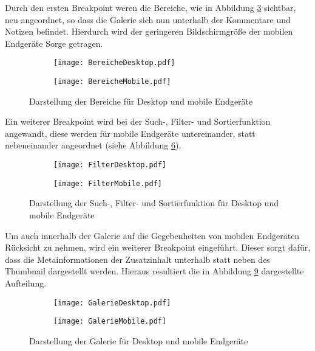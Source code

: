 Durch den ersten Breakpoint weren die Bereiche, wie in Abbildung \ref{fig:BereicheDesktopMobile} sichtbar, neu angeordnet, so dass die Galerie sich nun unterhalb der Kommentare und Notizen befindet. Hierdurch wird der geringeren Bildschirmgröße der mobilen Endgeräte Sorge getragen.

\begin{figure}[h!]
\begin{subfigure}[c]{0.5\textwidth}
\texttt{[image: BereicheDesktop.pdf]}
\label{fig:BereicheDesktop}
\end{subfigure}%
\begin{subfigure}[c]{0.5\textwidth}
\texttt{[image: BereicheMobile.pdf]}
\label{fig:BereicheMobile}
\end{subfigure}
\caption{Darstellung der Bereiche für Desktop und mobile Endgeräte}
\label{fig:BereicheDesktopMobile}
\end{figure}

Ein weiterer Breakpoint wird bei der Such-, Filter- und Sortierfunktion angewandt, diese werden für mobile Endgeräte untereinander, statt nebeneinander angeordnet (siehe Abbildung \ref{fig:FilterDesktopMobile}).

\begin{figure}[h!]
\begin{subfigure}[c]{0.5\textwidth}
\texttt{[image: FilterDesktop.pdf]}
\label{fig:FilterDesktop}
\end{subfigure}%
\begin{subfigure}[c]{0.5\textwidth}
\texttt{[image: FilterMobile.pdf]}
\label{fig:FilterMobile}
\end{subfigure}
\caption{Darstellung der Such-, Filter- und Sortierfunktion für Desktop und mobile Endgeräte}
\label{fig:FilterDesktopMobile}
\end{figure}

Um auch innerhalb der Galerie auf die Gegebenheiten von mobilen Endgeräten Rücksicht zu nehmen, wird ein weiterer Breakpoint eingeführt. Dieser sorgt dafür, dass die Metainformationen der Zusatzinhalt unterhalb statt neben des Thumbnail dargestellt werden. Hieraus resultiert die in Abbildung \ref{fig:GalerieDesktopMobile} dargestellte Aufteilung.

\begin{figure}[h!]
\begin{subfigure}[c]{0.5\textwidth}
\texttt{[image: GalerieDesktop.pdf]}
\label{fig:GalerieDesktop}
\end{subfigure}%
\begin{subfigure}[c]{0.5\textwidth}
\texttt{[image: GalerieMobile.pdf]}
\label{fig:GalerieMobile}
\end{subfigure}
\caption{Darstellung der Galerie für Desktop und mobile Endgeräte}
\label{fig:GalerieDesktopMobile}
\end{figure}

